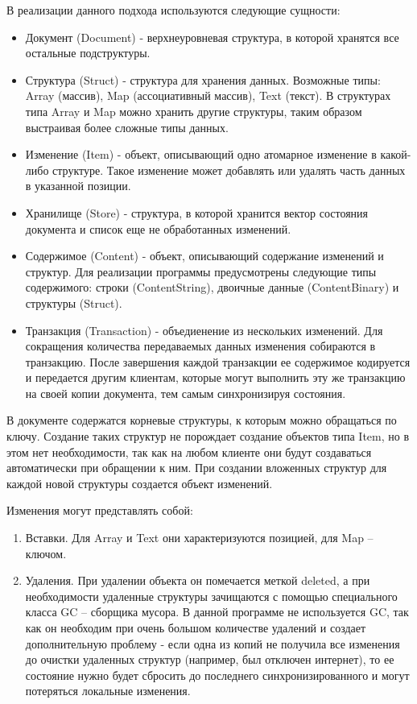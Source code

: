 \documentclass[a4paper,12pt]{article}
\begin{document}
    В реализации данного подхода используются следующие сущности:
    \begin{itemize}
        \item Документ (Document) - верхнеуровневая структура, в которой хранятся все остальные подструктуры.
        \item Структура (Struct) - структура для хранения данных. Возможные типы: Array (массив), Map (ассоциативный массив), Text (текст). В структурах типа Array и Map можно хранить другие структуры, таким образом выстраивая более сложные типы данных.
        \item Изменение (Item) - объект, описывающий одно атомарное изменение в какой-либо структуре. Такое изменение может добавлять или удалять часть данных в указанной позиции.
        \item Хранилище (Store) - структура, в которой хранится вектор состояния документа и список еще не обработанных изменений.
        \item Содержимое (Content) - объект, описывающий содержание изменений и структур. Для реализации программы предусмотрены следующие типы содержимого: строки (ContentString), двоичные данные (ContentBinary) и структуры (Struct).
        \item Транзакция (Transaction) - объедиенение из нескольких изменений. Для сокращения количества передаваемых данных изменения собираются в транзакцию. После завершения каждой транзакции ее содержимое кодируется и передается другим клиентам, которые могут выполнить эту же транзакцию на своей копии документа, тем самым синхронизируя состояния.
    \end{itemize}

    В документе содержатся корневые структуры, к которым можно обращаться по ключу. Создание таких структур не порождает создание объектов типа Item, но в этом нет необходимости, так как на любом клиенте они будут создаваться автоматически при обращении к ним. При создании вложенных структур для каждой новой структуры создается объект изменений.

    Изменения могут представлять собой:
    \begin{enumerate}
        \item Вставки. Для Array и Text они характеризуются позицией, для Map -- ключом.
        \item Удаления. При удалении объекта он помечается меткой deleted, а при необходимости удаленные структуры зачищаются с помощью специального класса GC -- сборщика мусора. В данной программе не используется GC, так как он необходим при очень большом количестве удалений и создает дополнительную проблему - если одна из копий не получила все изменения до очистки удаленных структур (например, был отключен интернет), то ее состояние нужно будет сбросить до последнего синхронизированного и могут потеряться локальные изменения.
    \end{enumerate}
\end{document}
